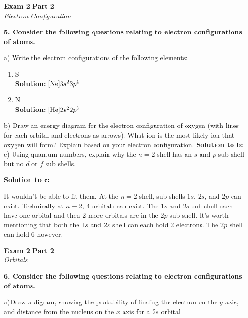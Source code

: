 \documentclass{article}
\begin{document}
    \begin{center}
        \textbf{Exam 2 Part 2}\\
        \textit{Electron Configuration}
    \end{center}
    \textbf{5. Consider the following questions relating to electron configurations of atoms.}

    a) Write the electron configurations of the following elements:
    \begin{enumerate}
        \item S\\
        \textbf{Solution: }
        $[\ce{Ne}]3s^{2}3p^{4}$
        \item N\\
        \textbf{Solution: }
        $[\ce{He}]2s^{2}2p^{3}$
    \end{enumerate}

    b) Draw an energy diagram for the electron configuration of oxygen (with lines for each orbital and electrons as arrows). What ion is the most likely ion that oxygen will form? Explain based on your electron configuration.
    \textbf{Solution to b: }\\[3cm]


    c) Using quantum numbers, explain why the $n = 2$ shell has an $s$ and $p$ sub shell but no $d$ or $f$ sub shells.

    \textbf{Solution to c: }

    It wouldn't be able to fit them. At the $n = 2$ shell, sub shells $1s$, $2s$, and $2p$ can exist. Technically at $n = 2$, 4 orbitals can exist. The $1s$ and $2s$ sub shell each have one orbital and then 2 more orbitals are in the $2p$ sub shell. It's worth mentioning that both the $1s$ and $2s$ shell can each hold 2 electrons. The $2p$ shell can hold 6 however.

    \pagebreak

    \begin{center}
        \textbf{Exam 2 Part 2}\\
        \textit{Orbitals}
    \end{center}
    \textbf{6. Consider the following questions relating to electron configurations of atoms.}

    a)Draw a digram, showing the probability of finding the electron on the $y$ axis, and distance from the nucleus on the $x$ axis for a $2s$ orbital\\[2cm]
\end{document}
